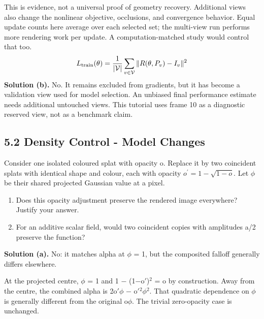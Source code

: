\documentclass[11pt,a4paper]{article}
\begin{document}
This is evidence, not a universal proof of geometry recovery.
Additional views also change the nonlinear objective, occlusions, and convergence behavior.
Equal update counts here average over each selected set; the multi-view run performs more rendering work per update.
A computation-matched study would control that too.
\[
L_{\rm train}(\theta)=\frac1{|\mathcal V|}\sum_{v\in\mathcal V}\|R(\theta,P_v)-I_v\|^2
\]
\noindent\textbf{Solution (b).} No.
It remains excluded from gradients, but it has become a validation view used for model selection.
An unbiased final performance estimate needs additional untouched views.
This tutorial uses frame 10 as a diagnostic reserved view, not as a benchmark claim.
\subsection*{5.2 Density Control - Model Changes}
Consider one isolated coloured splat with opacity o.
Replace it by two coincident splats with identical shape and colour, each with opacity $o^\prime=1-\sqrt{1-o}$.
Let $\phi$ be their shared projected Gaussian value at a pixel.
\begin{enumerate}[label=(\alph*),nosep]
\item Does this opacity adjustment preserve the rendered image everywhere?
Justify your answer.
\item For an additive scalar field, would two coincident copies with amplitudes a/2 preserve the function?
\end{enumerate}
\noindent\textbf{Solution (a).} No: it matches alpha at $\phi$ = 1, but the composited falloff generally differs elsewhere.

At the projected centre, $\phi$ = 1 and 1 $-$ (1$-$o$\prime$)${}^2$ = o by construction.
Away from the centre, the combined alpha is 2o$\prime$$\phi$ $-$ o$\prime$${}^2$$\phi$${}^2$.
That quadratic dependence on $\phi$ is generally different from the original o$\phi$.
The trivial zero-opacity case is unchanged.
\end{document}
